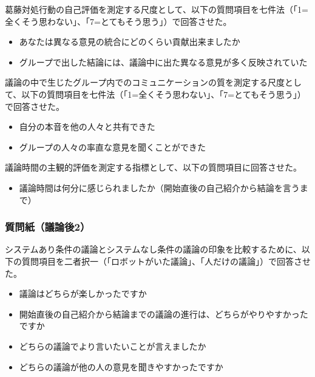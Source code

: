 \documentclass[11pt, a4paper]{jreport} %
\begin{document}
葛藤対処行動の自己評価を測定する尺度として、以下の質問項目を七件法（「1=全くそう思わない」、「7=とてもそう思う」）で回答させた。
\begin{itemize}
\setlength{\parskip}{-0.1cm} %
  \setlength{\itemsep}{-0.1cm} %
\item あなたは異なる意見の統合にどのくらい貢献出来ましたか
\item グループで出した結論には、議論中に出た異なる意見が多く反映されていた
\end{itemize}


議論の中で生じたグループ内でのコミュニケーションの質を測定する尺度として、以下の質問項目を七件法（「1=全くそう思わない」、「7=とてもそう思う」）で回答させた。
\begin{itemize}
\setlength{\parskip}{-0.1cm} %
  \setlength{\itemsep}{-0.1cm} %
\item 自分の本音を他の人々と共有できた
\item グループの人々の率直な意見を聞くことができた
\end{itemize}


議論時間の主観的評価を測定する指標として、以下の質問項目に回答させた。
\begin{itemize}
\setlength{\parskip}{-0.1cm} %
  \setlength{\itemsep}{-0.1cm} %
\item 議論時間は何分に感じられましたか（開始直後の自己紹介から結論を言うまで）
\end{itemize}




\subsubsection*{質問紙（議論後2）}
システムあり条件の議論とシステムなし条件の議論の印象を比較するために、以下の質問項目を二者択一（「ロボットがいた議論」、「人だけの議論」）で回答させた。

\begin{itemize}
\setlength{\parskip}{-0.1cm} %
  \setlength{\itemsep}{-0.1cm} %
\item 議論はどちらが楽しかったですか
\item 開始直後の自己紹介から結論までの議論の進行は、どちらがやりやすかったですか
\item どちらの議論でより言いたいことが言えましたか
\item どちらの議論が他の人の意見を聞きやすかったですか
\end{itemize}
\end{document}
